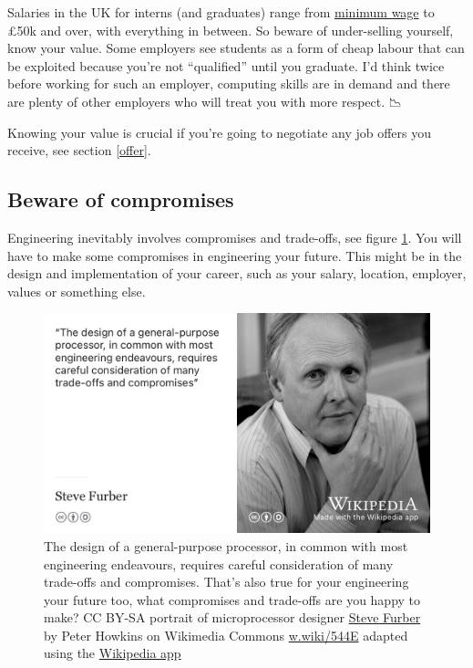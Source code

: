 \documentclass[
]{book}
\begin{document}
Salaries in the UK for interns (and graduates) range from \href{https://www.gov.uk/national-minimum-wage}{minimum wage} to £50k and over, with everything in between. So beware of under-selling yourself, know your value. Some employers see students as a form of cheap labour that can be exploited because you're not ``qualified'' until you graduate. I'd think twice before working for such an employer, computing skills are in demand and there are plenty of other employers who will treat you with more respect. 📉

Knowing your value is crucial if you're going to negotiate any job offers you receive, see section \ref{offer}.

\hypertarget{compromises}{%
\subsection{Beware of compromises}\label{compromises}}

Engineering inevitably involves compromises and trade-offs, see figure \ref{fig:furber-fig}. You will have to make some compromises in engineering your future. This might be in the design and implementation of your career, such as your salary, location, employer, values or something else.

\begin{figure}

{\centering \includegraphics[width=0.98\linewidth]{images/steve-furber} 

}

\caption{The design of a general-purpose processor, in common with most engineering endeavours, requires careful consideration of many trade-offs and compromises. \citep{furberarm} That's also true for your engineering your future too, what compromises and trade-offs are you happy to make? CC BY-SA portrait of microprocessor designer \href{https://en.wikipedia.org/wiki/Steve_Furber}{Steve Furber} by Peter Howkins on Wikimedia Commons \href{https://w.wiki/544E}{w.wiki/544E} adapted using the \href{https://apps.apple.com/gb/app/wikipedia/id324715238}{Wikipedia app}}\label{fig:furber-fig}
\end{figure}
\end{document}
